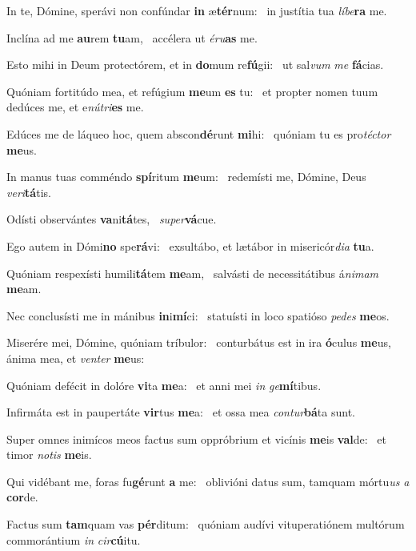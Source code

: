\item In te, Dómine, sperávi non confúndar \textbf{in} æ\textbf{tér}num:~\psstar{} in justítia tua \textit{líbe}\textbf{ra} me.
\item Inclína ad me \textbf{au}rem \textbf{tu}am,~\psstar{} accélera ut \textit{éru}\textbf{as} me.
\item Esto mihi in Deum protectórem, et in \textbf{do}mum re\textbf{fú}gii:~\psstar{} ut sal\textit{vum} \textit{me} \textbf{fá}cias.
\item Quóniam fortitúdo mea, et refúgium \textbf{me}um \textbf{es} tu:~\psstar{} et propter nomen tuum dedúces me, et e\textit{nútri}\textbf{es} me.
\item Edúces me de láqueo hoc, quem abscon\textbf{dé}runt \textbf{mi}hi:~\psstar{} quóniam tu es pro\textit{téctor} \textbf{me}us.
\item In manus tuas comméndo \textbf{spí}ritum \textbf{me}um:~\psstar{} redemísti me, Dómine, Deus \textit{veri}\textbf{tá}tis.
\item Odísti observántes \textbf{va}ni\textbf{tá}tes,~\psstar{} \textit{super}\textbf{vá}cue.
\item Ego autem in Dómi\textbf{no} spe\textbf{rá}vi:~\psstar{} exsultábo, et lætábor in misericór\textit{dia} \textbf{tu}a.
\item Quóniam respexísti humili\textbf{tá}tem \textbf{me}am,~\psstar{} salvásti de necessitátibus á\textit{nimam} \textbf{me}am.
\item Nec conclusísti me in mánibus \textbf{in}i\textbf{mí}ci:~\psstar{} statuísti in loco spatióso \textit{pedes} \textbf{me}os.
\item Miserére mei, Dómine, quóniam tríbulor:~\pscross{} conturbátus est in ira \textbf{ó}culus \textbf{me}us,~\psstar{} ánima mea, et \textit{venter} \textbf{me}us:
\item Quóniam defécit in dolóre \textbf{vi}ta \textbf{me}a:~\psstar{} et anni mei \textit{in} \textit{ge}\textbf{mí}tibus.
\item Infirmáta est in paupertáte \textbf{vir}tus \textbf{me}a:~\psstar{} et ossa mea \textit{contur}\textbf{bá}ta sunt.
\item Super omnes inimícos meos factus sum oppróbrium et vicínis \textbf{me}is \textbf{val}de:~\psstar{} et timor \textit{notis} \textbf{me}is.
\item Qui vidébant me, foras fu\textbf{gé}runt \textbf{a} me:~\psstar{} oblivióni datus sum, tamquam mórtu\textit{us} \textit{a} \textbf{cor}de.
\item Factus sum \textbf{tam}quam vas \textbf{pér}ditum:~\psstar{} quóniam audívi vituperatiónem multórum commorántium \textit{in} \textit{cir}\textbf{cú}itu.
